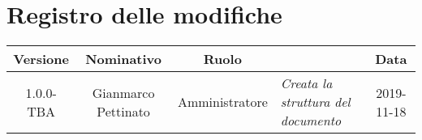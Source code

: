 \section*{Registro delle modifiche}
\renewcommand{\arraystretch}{1.8}

  \begin{longtable}{|c|c|c|p{3.8cm}|c|}
    \hline

    \rowcolor{header}
    \textbf{Versione} & \textbf{Nominativo} & \textbf{Ruolo} & \centering{\textbf{Descrizione}} & \textbf{Data}\\

    \hline

    1.0.0-TBA & Gianmarco Pettinato & Amministratore & \small{\textit{Creata la struttura del documento}} & 2019-11-18\\

    \hline
  \end{longtable}
